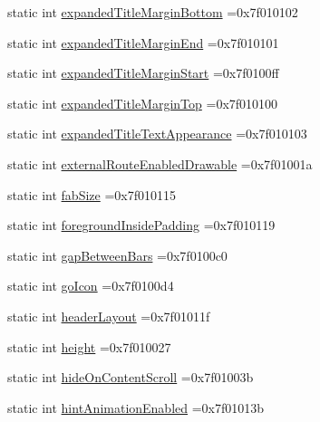 \begin{DoxyCompactItemize}
\item 
static int \hyperlink{classandroid_1_1support_1_1v4_1_1R_1_1attr_a605a1cf1c2977b6aefafeafd2cb9c602}{expanded\+Title\+Margin\+Bottom} =0x7f010102
\item 
static int \hyperlink{classandroid_1_1support_1_1v4_1_1R_1_1attr_a3e17776e2fac31da200756b8bba4c1b6}{expanded\+Title\+Margin\+End} =0x7f010101
\item 
static int \hyperlink{classandroid_1_1support_1_1v4_1_1R_1_1attr_a2081b8dc1c473ecad9c64a00841c4d5c}{expanded\+Title\+Margin\+Start} =0x7f0100ff
\item 
static int \hyperlink{classandroid_1_1support_1_1v4_1_1R_1_1attr_a8ff24ef763c69050c7178b685ee96561}{expanded\+Title\+Margin\+Top} =0x7f010100
\item 
static int \hyperlink{classandroid_1_1support_1_1v4_1_1R_1_1attr_a69dbcfdcd006db32b95a1424ebe2dd94}{expanded\+Title\+Text\+Appearance} =0x7f010103
\item 
static int \hyperlink{classandroid_1_1support_1_1v4_1_1R_1_1attr_a9093b99d885b00ebfb4ceb7d8f2ca206}{external\+Route\+Enabled\+Drawable} =0x7f01001a
\item 
static int \hyperlink{classandroid_1_1support_1_1v4_1_1R_1_1attr_a2f96544f9044e6ee88ee775bc42fae22}{fab\+Size} =0x7f010115
\item 
static int \hyperlink{classandroid_1_1support_1_1v4_1_1R_1_1attr_a663fcdc23331956da2a2e08118e3d258}{foreground\+Inside\+Padding} =0x7f010119
\item 
static int \hyperlink{classandroid_1_1support_1_1v4_1_1R_1_1attr_a2816042f891807fadc5b644a75c9857f}{gap\+Between\+Bars} =0x7f0100c0
\item 
static int \hyperlink{classandroid_1_1support_1_1v4_1_1R_1_1attr_ad09751f3e3e8e8f66d33642b913bc660}{go\+Icon} =0x7f0100d4
\item 
static int \hyperlink{classandroid_1_1support_1_1v4_1_1R_1_1attr_a3832cf62beb2ee9abc9cf44e6d387519}{header\+Layout} =0x7f01011f
\item 
static int \hyperlink{classandroid_1_1support_1_1v4_1_1R_1_1attr_a991d4e3217e3aec7fcb237693e406b04}{height} =0x7f010027
\item 
static int \hyperlink{classandroid_1_1support_1_1v4_1_1R_1_1attr_aa4d568c6c84659b535243051a2556f57}{hide\+On\+Content\+Scroll} =0x7f01003b
\item 
static int \hyperlink{classandroid_1_1support_1_1v4_1_1R_1_1attr_af892acc4465801168a6992e839fecefc}{hint\+Animation\+Enabled} =0x7f01013b
\item 

\end{DoxyCompactItemize}
